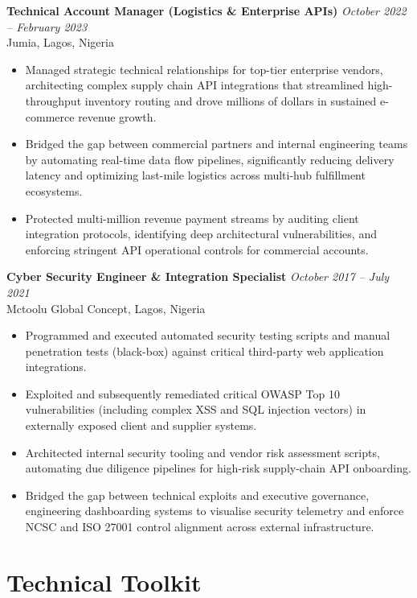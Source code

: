 \documentclass[11pt,a4paper]{article}
\begin{document}
\textbf{Technical Account Manager (Logistics \& Enterprise APIs)} \hfill \textit{October 2022 -- February 2023}\\
  Jumia, Lagos, Nigeria
  
  \begin{itemize}
    \item Managed strategic technical relationships for top-tier enterprise vendors, architecting complex supply chain API integrations that streamlined high-throughput inventory routing and drove millions of dollars in sustained e-commerce revenue growth.
    \item Bridged the gap between commercial partners and internal engineering teams by automating real-time data flow pipelines, significantly reducing delivery latency and optimizing last-mile logistics across multi-hub fulfillment ecosystems.
    \item Protected multi-million revenue payment streams by auditing client integration protocols, identifying deep architectural vulnerabilities, and enforcing stringent API operational controls for commercial accounts.
\end{itemize}

\textbf{Cyber Security Engineer \& Integration Specialist} \hfill \textit{October 2017 -- July 2021}\\
Mctoolu Global Concept, Lagos, Nigeria

\begin{itemize}
  \item Programmed and executed automated security testing scripts and manual penetration tests (black-box) against critical third-party web application integrations.
  \item Exploited and subsequently remediated critical OWASP Top 10 vulnerabilities (including complex XSS and SQL injection vectors) in externally exposed client and supplier systems.
  \item Architected internal security tooling and vendor risk assessment scripts, automating due diligence pipelines for high-risk supply-chain API onboarding.
  \item Bridged the gap between technical exploits and executive governance, engineering dashboarding systems to visualise security telemetry and enforce NCSC and ISO 27001 control alignment across external infrastructure.
\end{itemize}

\section*{Technical Toolkit}
\end{document}
